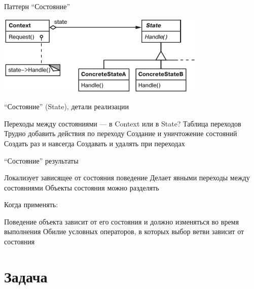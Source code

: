 \documentclass{../../slides-style}
\begin{document}
    \begin{frame}{Паттерн \enquote{Состояние}}
        \begin{center}
            \includegraphics[width=0.75\textwidth]{state.png}
        \end{center}
    \end{frame}

    \begin{frame}{\enquote{Состояние} (State), детали реализации}
        \begin{outline}
            \1 Переходы между состояниями --- в Context или в State?
            \1 Таблица переходов
                \2 Трудно добавить действия по переходу
            \1 Создание и уничтожение состояний
                \2 Создать раз и навсегда
                \2 Создавать и удалять при переходах
        \end{outline}
    \end{frame}

    \begin{frame}{\enquote{Состояние} результаты}
        \begin{outline}
            \1 Локализует зависящее от состояния поведение
            \1 Делает явными переходы между состояниями
            \1 Объекты состояния можно разделять
        \end{outline}
        Когда применять:
        \begin{outline}
            \1 Поведение объекта зависит от его состояния и должно изменяться во время выполнения
            \1 Обилие условных операторов, в которых выбор ветви зависит от состояния
        \end{outline}
    \end{frame}

    \section{Задача}
\end{document}
